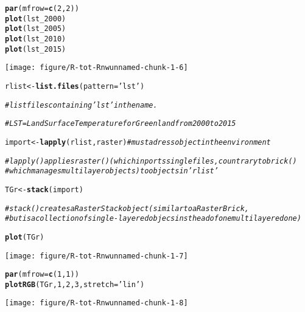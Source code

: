 \documentclass{article}\usepackage[]{graphicx}\usepackage[]{color}
\makeatletter
\newcommand{\hlnum}[1]{\textcolor[rgb]{0.686,0.059,0.569}{#1}}%
\newcommand{\hlstr}[1]{\textcolor[rgb]{0.192,0.494,0.8}{#1}}%
\newcommand{\hlcom}[1]{\textcolor[rgb]{0.678,0.584,0.686}{\textit{#1}}}%
\newcommand{\hlstd}[1]{\textcolor[rgb]{0.345,0.345,0.345}{#1}}%
\newcommand{\hlkwb}[1]{\textcolor[rgb]{0.69,0.353,0.396}{#1}}%
\newcommand{\hlkwc}[1]{\textcolor[rgb]{0.333,0.667,0.333}{#1}}%
\newcommand{\hlkwd}[1]{\textcolor[rgb]{0.737,0.353,0.396}{\textbf{#1}}}%
\newenvironment{kframe}{%
 \def\at@end@of@kframe{}%
 \ifinner\ifhmode%
  \def\at@end@of@kframe{\end{minipage}}%
  \begin{minipage}{\columnwidth}%
 \fi\fi%
 \def\FrameCommand##1{\hskip\@totalleftmargin \hskip-\fboxsep
 \colorbox{shadecolor}{##1}\hskip-\fboxsep
     \hskip-\linewidth \hskip-\@totalleftmargin \hskip\columnwidth}%
 \MakeFramed {\advance\hsize-\width
   \@totalleftmargin\z@ \linewidth\hsize
   \@setminipage}}%
 {\par\unskip\endMakeFramed%
 \at@end@of@kframe}
\newenvironment{knitrout}{}{} %
\makeatother
\begin{document}
\begin{knitrout}
\begin{kframe}
\begin{alltt}
\hlkwd{par}\hlstd{(}\hlkwc{mfrow} \hlstd{=} \hlkwd{c}\hlstd{(}\hlnum{2}\hlstd{,} \hlnum{2}\hlstd{))}
\hlkwd{plot}\hlstd{(lst_2000)}
\hlkwd{plot}\hlstd{(lst_2005)}
\hlkwd{plot}\hlstd{(lst_2010)}
\hlkwd{plot}\hlstd{(lst_2015)}
\end{alltt}
\end{kframe}

{\centering \texttt{[image: figure/R-tot-Rnwunnamed-chunk-1-6]} 

}


\begin{kframe}\begin{alltt}
\hlstd{rlist} \hlkwb{<-} \hlkwd{list.files}\hlstd{(}\hlkwc{pattern} \hlstd{=} \hlstr{'lst'}\hlstd{)}

\hlcom{# list files containing 'lst' in the name. }

\hlcom{# LST = Land Surface Temperature for Greenland from 2000 to 2015}

\hlstd{import} \hlkwb{<-} \hlkwd{lapply}\hlstd{(rlist, raster)} \hlcom{# must adress object in the environment}

\hlcom{# lapply() applies raster() (which inports single files, countrary to brick()}
\hlcom{# which manages multilayer objects) to objects in 'rlist'}

\hlstd{TGr} \hlkwb{<-} \hlkwd{stack}\hlstd{(import)}

\hlcom{# stack() creates a RasterStack object (similar to a RasterBrick,}
\hlcom{# but is a collection of single-layered objecs insthead of one multilayered one)}

\hlkwd{plot}\hlstd{(TGr)}
\end{alltt}
\end{kframe}

{\centering \texttt{[image: figure/R-tot-Rnwunnamed-chunk-1-7]} 

}


\begin{kframe}\begin{alltt}
\hlkwd{par}\hlstd{(}\hlkwc{mfrow} \hlstd{=} \hlkwd{c}\hlstd{(}\hlnum{1}\hlstd{,} \hlnum{1}\hlstd{))}
\hlkwd{plotRGB}\hlstd{(TGr,} \hlnum{1}\hlstd{,} \hlnum{2}\hlstd{,} \hlnum{3}\hlstd{,} \hlkwc{stretch} \hlstd{=} \hlstr{'lin'}\hlstd{)}
\end{alltt}
\end{kframe}

{\centering \texttt{[image: figure/R-tot-Rnwunnamed-chunk-1-8]} 

}
\end{knitrout}
\end{document}

